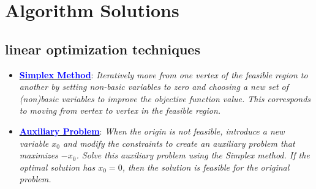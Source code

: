 \documentclass{article}%
\begin{document}
\section{Algorithm Solutions}%
\label{sec:AlgorithmSolutions}%
\begin{itemize}[leftmargin=*]%
\subsection{linear optimization techniques}%
\label{subsec:linearoptimizationtechniques}%
\begin{itemize}[leftmargin=*]%
\item \href{https://www.math.purdue.edu/~yipn/421/2024-08-27-ExSimplex.pdf#page=6}{\textbf{\textcolor{blue}{Simplex Method}}}: \emph{Iteratively move from one vertex of the feasible region to another by setting non-basic variables to zero and choosing a new set of (non)basic variables to improve the objective function value. This corresponds to moving from vertex to vertex in the feasible region.}%
\item \href{https://www.math.purdue.edu/~yipn/421/2024-08-27-ExSimplex.pdf#page=32}{\textbf{\textcolor{blue}{Auxiliary Problem}}}: \emph{When the origin is not feasible, introduce a new variable $x_0$ and modify the constraints to create an auxiliary problem that maximizes $-x_0$. Solve this auxiliary problem using the Simplex method. If the optimal solution has $x_0 = 0$, then the solution is feasible for the original problem.}%
\end{itemize}

%
\end{itemize}%
\newpage

%
\end{document}
